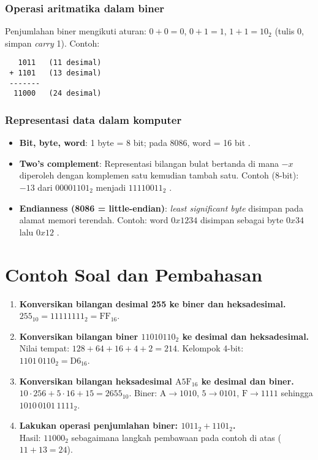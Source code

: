 \subsubsection{Operasi aritmatika dalam biner}
Penjumlahan biner mengikuti aturan: \(0+0=0\), \(0+1=1\), \(1+1=10_2\) (tulis 0, simpan \textit{carry} 1). Contoh:
\begin{verbatim}
   1011   (11 desimal)
 + 1101   (13 desimal)
 -------
  11000   (24 desimal)
\end{verbatim}

\subsubsection{Representasi data dalam komputer}
\begin{itemize}
    \item \textbf{Bit, byte, word}: 1 byte = 8 bit; pada 8086, word = 16 bit \cite{intel2019manual32}.
    \item \textbf{Two's complement}: Representasi bilangan bulat bertanda di mana \(-x\) diperoleh dengan komplemen satu kemudian tambah satu. Contoh (8-bit): \(-13\) dari \(00001101_2\) menjadi \(11110011_2\) \cite{hyde2010art}.
    \item \textbf{Endianness (8086 = little-endian)}: \textit{least significant byte} disimpan pada alamat memori terendah. Contoh: word \(0x1234\) disimpan sebagai byte \(0x34\) lalu \(0x12\) \cite{intel2019manual32}.
\end{itemize}

\section{Contoh Soal dan Pembahasan}\label{sec:pengenalan-contoh}
\begin{enumerate}
    \item \textbf{Konversikan bilangan desimal 255 ke biner dan heksadesimal.}\\
    \(255_{10} = 11111111_2 = \mathrm{FF}_{16}\).

    \item \textbf{Konversikan bilangan biner \(11010110_2\) ke desimal dan heksadesimal.}\\
    Nilai tempat: \(128+64+16+4+2 = 214\). Kelompok 4-bit: \(1101\,0110_2 = \mathrm{D6}_{16}\).

    \item \textbf{Konversikan bilangan heksadesimal \(\mathrm{A5F}_{16}\) ke desimal dan biner.}\\
    \(10\cdot 256 + 5\cdot 16 + 15 = 2655_{10}\). Biner: \(\mathrm{A}\to 1010\), \(\mathrm{5}\to 0101\), \(\mathrm{F}\to 1111\) sehingga \(1010\,0101\,1111_2\).

    \item \textbf{Lakukan operasi penjumlahan biner: \(1011_2 + 1101_2\).}\\
    Hasil: \(11000_2\) sebagaimana langkah pembawaan pada contoh di atas (\(11+13=24\)).
\end{enumerate}


